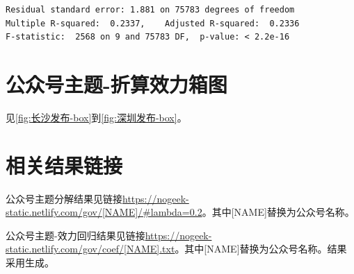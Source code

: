 \documentclass[a4paper,12pt,UTF8]{article}
\begin{document}
    \begin{lstlisting}
Residual standard error: 1.881 on 75783 degrees of freedom
Multiple R-squared:  0.2337,	Adjusted R-squared:  0.2336 
F-statistic:  2568 on 9 and 75783 DF,  p-value: < 2.2e-16
    \end{lstlisting}

    \appendix
    \section{公众号主题-折算效力箱图}
    见\cref{fig:长沙发布-box}到\cref{fig:深圳发布-box}。
    
    \section{相关结果链接}
    公众号主题分解结果见链接\url{https://nogeek-static.netlify.com/gov/[NAME]/#lambda=0.2}。其中[NAME]替换为公众号名称。

    公众号主题-效力回归结果见链接\url{https://nogeek-static.netlify.com/gov/coef/[NAME].txt}。其中[NAME]替换为公众号名称。结果采用\cite{stargazer}生成。

    \label{applastpage}
    \newpage
    
    

\end{document}

